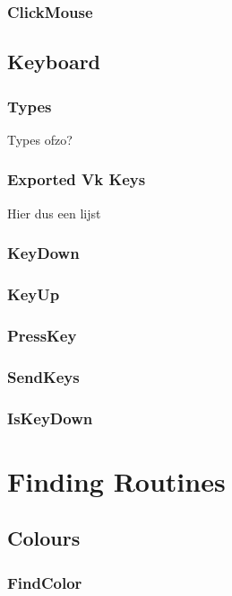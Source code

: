 \documentclass[a4paper]{report}
\begin{document}
\subsection{ClickMouse}

\section{Keyboard}

\subsection{Types}

Types ofzo?

\subsection{Exported Vk Keys}

Hier dus een lijst

\subsection{KeyDown}

\subsection{KeyUp}

\subsection{PressKey}

\subsection{SendKeys}

\subsection{IsKeyDown}

\chapter{Finding Routines}

\section{Colours}

\subsection{FindColor}
\end{document}

